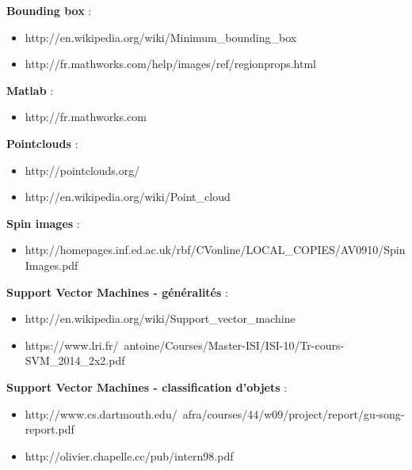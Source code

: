 \textbf{Bounding box} :
\begin{itemize}
	\item http://en.wikipedia.org/wiki/Minimum\_bounding\_box
	\item http://fr.mathworks.com/help/images/ref/regionprops.html
\end{itemize}

\textbf{Matlab} : 
\begin{itemize}
	\item http://fr.mathworks.com
\end{itemize}

\textbf{Pointclouds} : 
\begin{itemize}
	\item http://pointclouds.org/
	\item http://en.wikipedia.org/wiki/Point\_cloud
\end{itemize}

\textbf{Spin images} :
\begin{itemize}
	\item http://homepages.inf.ed.ac.uk/rbf/CVonline/LOCAL\_COPIES/AV0910/SpinImages.pdf
\end{itemize}

\textbf{Support Vector Machines - généralités} : 
\begin{itemize}
	\item http://en.wikipedia.org/wiki/Support\_vector\_machine
	\item https://www.lri.fr/~antoine/Courses/Master-ISI/ISI-10/Tr-cours-SVM\_2014\_2x2.pdf
\end{itemize}

\textbf{Support Vector Machines - classification d'objets} :
\begin{itemize}
	\item http://www.cs.dartmouth.edu/~afra/courses/44/w09/project/report/gu-song-report.pdf
	\item http://olivier.chapelle.cc/pub/intern98.pdf
\end{itemize}
